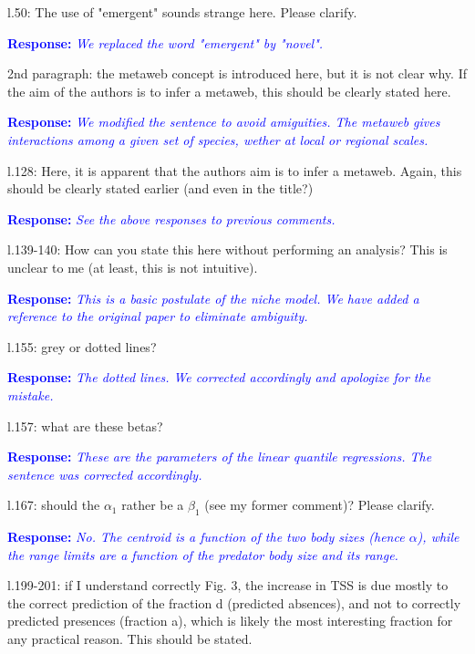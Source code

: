 \documentclass [12pt,onecolumn,twoside,openright]{report}
\begin{document}
\begin{onehalfspacing}
\medskip l.50: The use of "emergent" sounds strange here.
Please clarify.

\textcolor{blue}{\textbf{Response:}} \textit{\textcolor{blue}{ We replaced the word "emergent" by "novel".}}

\medskip 2nd paragraph: the metaweb concept is introduced
here, but it is not clear why. If the aim of the authors is to infer a metaweb,
this should be clearly stated here.

\textcolor{blue}{\textbf{Response:}} \textit{\textcolor{blue}{We modified the sentence to avoid amiguities. The metaweb gives interactions among a given set of species, wether at local or regional scales.}}

\medskip l.128: Here, it is apparent that the authors aim is
to infer a metaweb. Again, this should be clearly stated earlier (and even in
the title?)

\textcolor{blue}{\textbf{Response:}} \textit{\textcolor{blue}{See the above responses to previous comments.}}

\medskip l.139-140: How can you state this here without
performing an analysis? This is unclear to me (at least, this is not intuitive).

\textcolor{blue}{\textbf{Response:}} \textit{\textcolor{blue}{This is a basic
postulate of the niche model. We have added a reference to the original paper to
eliminate ambiguity.}}

\medskip l.155: grey or dotted lines?

\textcolor{blue}{\textbf{Response:}} \textit{\textcolor{blue}{The
  \emph{dotted} lines. We corrected accordingly and apologize for the mistake.}}

\medskip l.157: what are these betas?

\textcolor{blue}{\textbf{Response:}} \textit{\textcolor{blue}{These are the parameters of the linear quantile regressions. The sentence was corrected accordingly.}}

\medskip l.167: should the $\alpha_1$ rather be a $\beta_1$
(see my former comment)? Please clarify.


\textcolor{blue}{\textbf{Response:}} \textit{\textcolor{blue}{No. The centroid
is a function of the two body sizes (hence $\alpha$), while the range limits are
a function of the predator body size and its range.}}

\medskip l.199-201: if I understand correctly Fig. 3, the
increase in TSS is due mostly to the correct prediction of the fraction d
(predicted absences), and not to correctly predicted presences (fraction a),
which is likely the most interesting fraction for any practical reason. This
should be stated.


\end{onehalfspacing}
\end{document}
